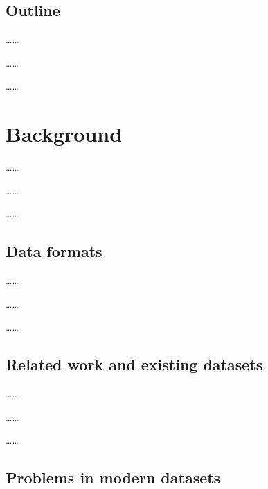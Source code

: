 \documentclass[sigconf]{acmart}
\begin{document}
\subsection{Outline}


\dots \dots

\dots \dots

\dots \dots

\section{Background}\label{Sec:background}

\dots \dots

\dots \dots

\dots \dots

\subsection{Data formats}
\dots \dots

\dots \dots

\dots \dots

\subsection{Related work and existing datasets}
\dots \dots

\dots \dots

\dots \dots

\subsection{Problems in modern datasets}\label{Sec:problems}
\end{document}
